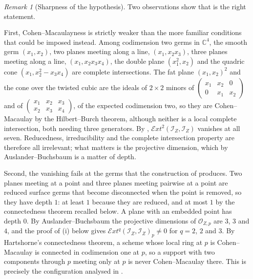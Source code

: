 \documentclass[11pt,reqno]{amsart}
\theoremstyle{plain}
\theoremstyle{definition}
\theoremstyle{remark}
\newtheorem{remark}[theorem]{Remark}
\newcommand{\CC}{\mathbb{C}}
\newcommand{\cE}{\mathcal{E}}
\newcommand{\cO}{\mathcal{O}}
\newcommand{\cI}{\mathcal{I}}
\begin{document}
\begin{remark}[Sharpness of the hypothesis]%
\label{rem:cmsharp}
Two observations show that  is the right statement.

First, Cohen--Macaulayness is strictly weaker than the more familiar
conditions that could be imposed instead. Among codimension two germs in
$\CC^{4}$, the smooth germ $(x_{1},x_{2})$, two planes meeting along a line,
$(x_{1},x_{2}x_{3})$, three planes meeting along a line,
$(x_{1},x_{2}x_{3}x_{4})$, the double plane $(x_{1}^{2},x_{2})$ and the
quadric cone $(x_{1},x_{2}^{2}-x_{3}x_{4})$ are complete intersections. The
fat plane $(x_{1},x_{2})^{2}$ and the cone over the twisted cubic are the
ideals of $2\times2$ minors of
$\left(\begin{smallmatrix}x_{1}&x_{2}&0\\
0&x_{1}&x_{2}\end{smallmatrix}\right)$ and of
$\left(\begin{smallmatrix}x_{1}&x_{2}&x_{3}\\
x_{2}&x_{3}&x_{4}\end{smallmatrix}\right)$, of the expected codimension two,
so they are Cohen--Macaulay by the Hilbert--Burch theorem, although neither
is a local complete intersection, both needing three generators. By
, $\cE xt^{2}(\cI_{Z},\cI_{Z})$ vanishes at all seven.
Reducedness, irreducibility and the complete intersection property are
therefore all irrelevant; what matters is the projective dimension, which by
Auslander--Buchsbaum is a matter of depth.

Second, the vanishing fails at the germs that the construction of
 produces. Two planes meeting at a point and three planes
meeting pairwise at a point are reduced surface germs that become
disconnected when the point is removed, so they have depth $1$: at least $1$
because they are reduced, and at most $1$ by the connectedness theorem
recalled below. A plane with an embedded point has depth $0$. By Auslander--Buchsbaum the projective
dimensions of $\cO_{Z,p}$ are $3$, $3$ and $4$, and the proof of
(i) below gives $\cE xt^{q}(\cI_{Z},\cI_{Z})_{p}\ne0$
for $q=2$, $2$ and $3$. By Hartshorne's connectedness theorem, a scheme whose local ring at $p$
is Cohen--Macaulay is connected in codimension one at $p$, so a support with
two components through $p$ meeting only at $p$ is never Cohen--Macaulay
there. This is precisely the configuration analysed in
.
\end{remark}
\end{document}
